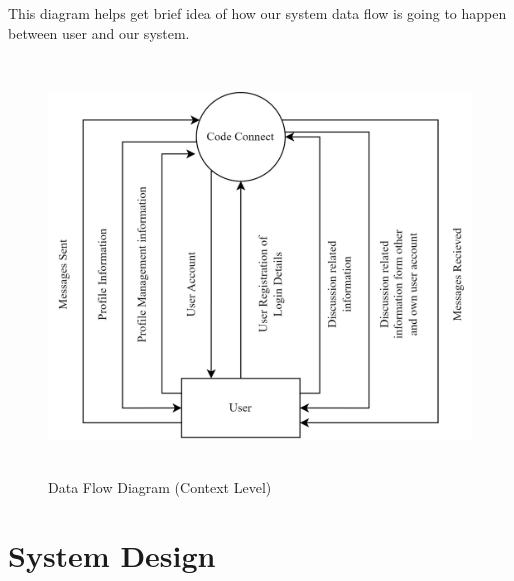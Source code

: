This diagram helps get brief idea of how our system data flow is going to happen between user and our system.
\begin{figure}[H]
    \centering
    \includegraphics[height = 11cm]{Diagrams/DFD.drawio.png}
    \caption{Data Flow Diagram (Context Level)}
\end{figure}
\newpage
\section{System Design}
